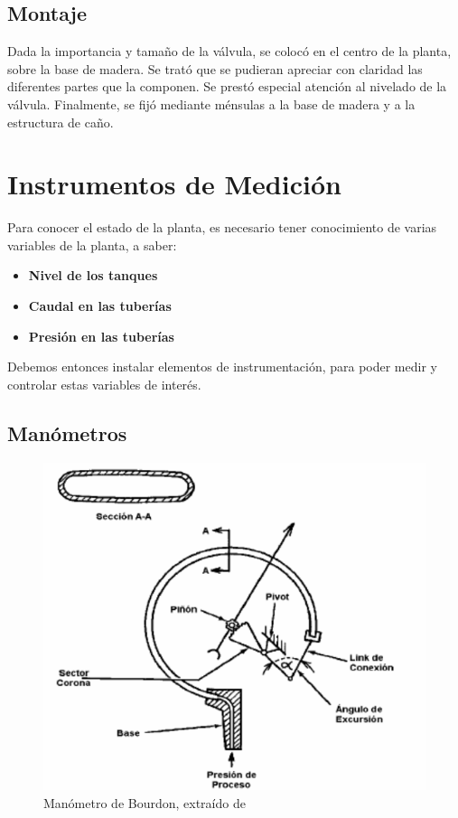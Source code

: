 \subsection{Montaje}
Dada la importancia y tamaño de la válvula, se colocó en el centro de
la planta, sobre la base de madera. Se trató que se pudieran apreciar
con claridad las diferentes partes que la componen.
Se prestó especial atención al nivelado de la válvula.
Finalmente, se fijó mediante ménsulas a la base de madera y a la estructura
de caño.

\section{Instrumentos de Medición}
\label{sec:InstrumentosMedicion}
Para conocer el estado de la planta, es necesario tener conocimiento de varias
variables de la planta, a saber:
\begin{itemize}
 \item \textbf{Nivel de los tanques}
 \item \textbf{Caudal en las tuberías}
 \item \textbf{Presión en las tuberías}
\end{itemize}
Debemos entonces instalar elementos de instrumentación, para poder
medir y controlar estas variables de interés.

\subsection{Manómetros}
\label{subsec:Manometros}

\begin{figure}[t]
 \centering
\includegraphics[width=.55\textwidth]
{Cap2-DisenoEnsamblado/images/manomBourdon.png}
 \caption{Manómetro de Bourdon, extraído de \cite{bib:ApuntesPuglesiPlacaOrif}}
 \label{fig:manometroBourdon}
\end{figure}

